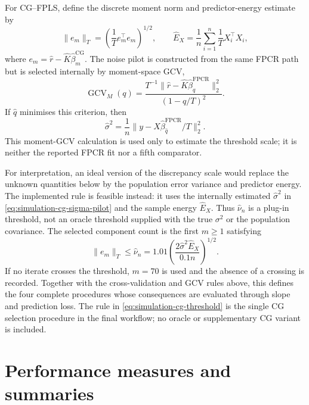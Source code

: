 For CG--FPLS, define the discrete moment norm and predictor-energy estimate by
\begin{equation}
    \|e_m\|_T
    =\left(\frac1T e_m^\top e_m\right)^{1/2},
    \qquad
    \widehat E_X
    =\frac1n\sum_{i=1}^{n}\frac1T X_i^\top X_i,
    \label{eq:simulation-cg-norms}
\end{equation}
where $e_m=\widehat r-\widehat K\widehat\beta_m^{\mathrm{CG}}$.  The noise
pilot is constructed from the same FPCR path but is selected internally by
moment-space GCV,
\begin{equation}
    \operatorname{GCV}_{M}(q)
    =\frac{T^{-1}\|\widehat r-\widehat K
      \widehat\beta_q^{\mathrm{FPCR}}\|_2^2}
           {(1-q/T)^2}.
    \label{eq:simulation-moment-gcv}
\end{equation}
If $\widehat q$ minimises this criterion, then
\begin{equation}
    \widehat\sigma^2
    =\frac1n\|y-X\widehat\beta_{\widehat q}^{\mathrm{FPCR}}/T\|_2^2.
    \label{eq:simulation-cg-sigma-pilot}
\end{equation}
This moment-GCV calculation is used only to estimate the threshold scale; it
is neither the reported FPCR fit nor a fifth comparator.

For interpretation, an ideal version of the discrepancy scale would replace
the unknown quantities below by the population error variance and predictor
energy.  The implemented rule is feasible instead: it uses the internally
estimated $\widehat\sigma^2$ in
\eqref{eq:simulation-cg-sigma-pilot} and the sample energy
$\widehat E_X$.  Thus $\widehat\nu_n$ is a plug-in threshold, not an oracle
threshold supplied with the true $\sigma^2$ or the population covariance.
The selected component count is the first $m\geq1$ satisfying
\begin{equation}
    \|e_m\|_T
    \leq
    \widehat\nu_n
    =1.01\left(
      \frac{2\widehat\sigma^2\widehat E_X}{0.1n}
      \right)^{1/2}.
    \label{eq:simulation-cg-threshold}
\end{equation}
If no iterate crosses the threshold, $m=70$ is used and the absence of a
crossing is recorded.  Together with the cross-validation and GCV rules above,
this defines the four complete procedures whose consequences are evaluated
through slope and prediction loss.  The rule in
\eqref{eq:simulation-cg-threshold} is the single CG selection procedure in the
final workflow; no oracle or supplementary CG variant is included.

\section{Performance measures and summaries}
\label{sec:simulation-criteria}

